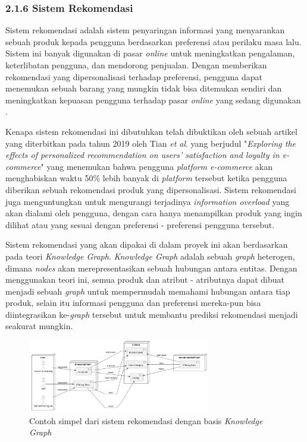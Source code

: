 \documentclass[a4paper]{article}
\newcommand{\subsubbab}[1]{%
    \subsubsection*{#1}%
    \addcontentsline{toc}{subsubsection}{\protect\numberline{}#1}%
}
\begin{document}
\subsubbab{2.1.6 Sistem Rekomendasi}
Sistem rekomendasi adalah sistem penyaringan informasi yang menyarankan sebuah produk kepada pengguna berdasarkan preferensi atau perilaku masa lalu. Sistem ini banyak digunakan di pasar \textit{online} untuk meningkatkan pengalaman, keterlibatan pengguna, dan mendorong penjualan. Dengan memberikan rekomendasi yang dipersonalisasi terhadap preferensi, pengguna dapat menemukan sebuah barang yang mungkin tidak bisa ditemukan sendiri dan meningkatkan kepuasan pengguna terhadap pasar \textit{online} yang sedang digunakan \autocite{adiwardana2019}.

Kenapa sistem rekomendasi ini dibutuhkan telah dibuktikan oleh sebuah artikel yang diterbitkan pada tahun 2019 oleh Tian \textit{et al}. yang berjudul "\textit{Exploring the effects of personalized recommendation on users' satisfaction and loyalty in e-commerce}" yang menemukan bahwa pengguna \textit{platform e-commerce}  akan menghabiskan waktu 50\% lebih banyak di \textit{platform} tersebut ketika pengguna diberikan sebuah rekomendasi produk yang dipersonalisasi\autocite{tian2019exploring}. Sistem rekomendasi juga menguntungkan untuk mengurangi terjadinya \textit{information overload} yang akan dialami oleh pengguna, dengan cara hanya menampilkan produk yang ingin dilihat atau yang sesuai dengan preferensi - preferensi pengguna tersebut\autocite{karimi2018news}.

Sistem rekomendasi yang akan dipakai di dalam proyek ini akan berdasarkan pada teori \textit{Knowledge Graph}. \textit{Knowledge Graph} adalah sebuah \textit{graph} heterogen, dimana \textit{nodes} akan merepresentasikan sebuah hubungan antara entitas\autocite{guo2020survey}. Dengan menggunakan teori ini, semua produk dan atribut - atributnya dapat dibuat menjadi sebuah \textit{graph} untuk mempermudah memahami hubungan antara tiap produk, selain itu informasi pengguna dan preferensi mereka-pun bisa diintegrasikan ke-\textit{graph} tersebut untuk membantu prediksi rekomendasi menjadi seakurat mungkin.

\begin{figure}[h]
    \centering
    \includegraphics[width=8cm]{recommendation system architecture.png}
    \caption{Contoh simpel dari sistem rekomendasi dengan basis \textit{Knowledge Graph}}
\end{figure}
\end{document}
